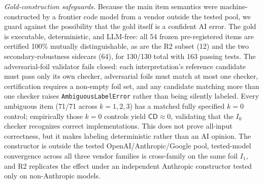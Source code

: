 \documentclass[acmsmall,screen,nonacm]{acmart}
\newcommand{\cd}{\textsf{CD}}
\begin{document}
\emph{Gold-construction safeguards.} Because the main item semantics were machine-constructed by a frontier
code model from a vendor outside the tested pool, we guard against the possibility that the gold itself is a confident AI error. The
gold is executable, deterministic, and LLM-free: all 54 frozen pre-registered items are certified 100\% mutually
distinguishable, as are the R2 subset (12) and the two secondary-robustness sidecars (64), for 130/130 total with 163 passing tests. The
adversarial-foil validator fails closed: each interpretation's reference candidate must pass only its own
checker, adversarial foils must match at most one checker, certification requires a non-empty foil set, and any
candidate matching more than one checker raises \texttt{AmbiguousLabelError} rather than being silently labeled.
Every ambiguous item (71/71 across $k{=}1,2,3$) has a matched fully specified $k{=}0$ control; empirically those
$k{=}0$ controls yield $\cd\approx0$, validating that the $I_0$ checker recognizes correct implementations.
This does not prove all-input correctness, but it makes labeling deterministic rather than an AI opinion. The
constructor is outside the tested OpenAI/Anthropic/Google pool, tested-model convergence across all three vendor
families is cross-family on the same foil $I_1$, and R2 replicates the effect under an independent Anthropic constructor tested only on
non-Anthropic models.
\end{document}
